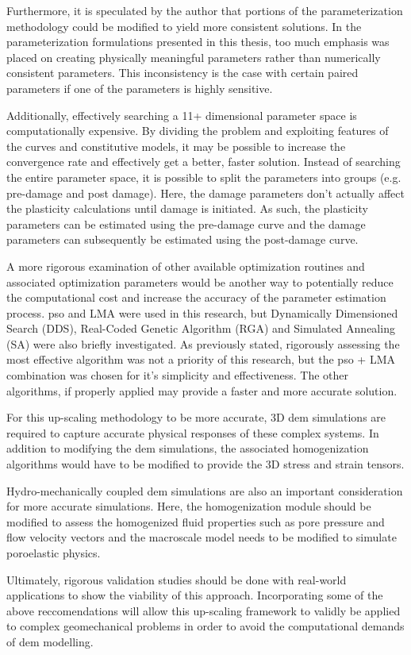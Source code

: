 Furthermore, it is speculated by the author that portions of the parameterization methodology could be modified to yield more consistent solutions. In the parameterization formulations presented in this thesis, too much emphasis was placed on creating physically meaningful parameters rather than numerically consistent parameters. This inconsistency is the case with certain paired parameters if one of the parameters is highly sensitive.

Additionally, effectively searching a 11+ dimensional parameter space is computationally expensive. By dividing the problem and exploiting features of the curves and constitutive models, it may be possible to increase the convergence rate and effectively get a better, faster solution. Instead of searching the entire parameter space, it is possible to split the parameters into groups (e.g. pre-damage and post damage). Here, the damage parameters don't actually affect the plasticity calculations until damage is initiated. As such, the plasticity parameters can be estimated using the pre-damage curve and the damage parameters can subsequently be estimated using the post-damage curve.

A more rigorous examination of other available optimization routines and associated optimization parameters would be another way to potentially reduce the computational cost and increase the accuracy of the parameter estimation process. \acrshort{pso} and LMA were used in this research, but Dynamically Dimensioned Search (DDS), 
Real-Coded Genetic Algorithm (RGA) and Simulated Annealing (SA) were also briefly investigated. As previously stated, rigorously assessing the most effective algorithm was not a priority of this research, but the \acrshort{pso} + LMA combination was chosen for it's simplicity and effectiveness. The other algorithms, if properly applied may provide a faster and more accurate solution.
	
For this up-scaling methodology to be more accurate, 3D \acrshort{dem} simulations are required to capture accurate physical responses of these complex systems. In addition to modifying the \acrshort{dem} simulations, the associated homogenization algorithms would have to be modified to provide the 3D stress and strain tensors. 

Hydro-mechanically coupled \acrshort{dem} simulations are also an important consideration for more accurate simulations. Here, the homogenization module should be modified to assess the homogenized fluid properties such as pore pressure and flow velocity vectors and the macroscale model needs to be modified to simulate poroelastic physics.

Ultimately, rigorous validation studies should be done with real-world applications to show the viability of this approach. Incorporating some of the above reccomendations will allow this up-scaling framework to validly be applied to complex geomechanical problems in order to avoid the computational demands of \acrshort{dem} modelling. 
